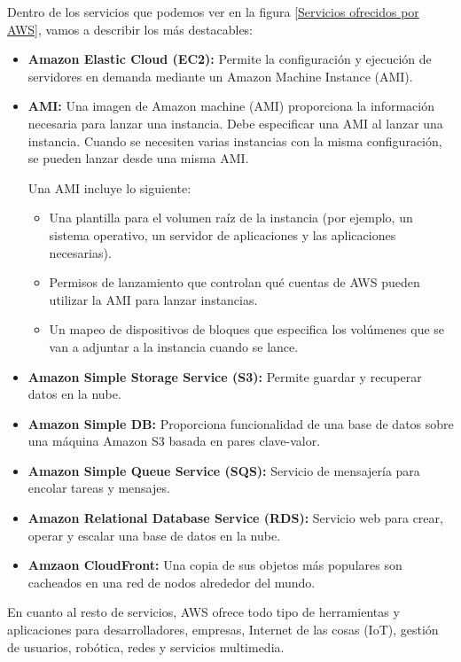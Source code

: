 Dentro de los servicios que podemos ver en la figura \ref{Servicios ofrecidos por AWS}, vamos a describir los más destacables:
\begin{itemize}
	\item \textbf{Amazon Elastic Cloud (EC2):} Permite la configuración y ejecución de servidores en demanda mediante un Amazon Machine Instance (AMI).
	\item \textbf{AMI:} Una imagen de Amazon machine (AMI) proporciona la información necesaria para lanzar una instancia. Debe especificar una AMI al lanzar una instancia. Cuando se necesiten varias instancias con la misma configuración, se pueden lanzar desde una misma AMI.
	
	Una AMI incluye lo siguiente:
	\begin{itemize}
		\item Una plantilla para el volumen raíz de la instancia (por ejemplo, un sistema operativo, un servidor de aplicaciones y las aplicaciones necesarias).
		\item Permisos de lanzamiento que controlan qué cuentas de AWS pueden utilizar la AMI para lanzar instancias.
		\item Un mapeo de dispositivos de bloques que especifica los volúmenes que se van a adjuntar a la instancia cuando se lance.
	\end{itemize}
	\item \textbf{Amazon Simple Storage Service (S3):} Permite guardar y recuperar datos en la nube.
	\item \textbf{Amazon Simple DB:} Proporciona funcionalidad de una base de datos sobre una máquina Amazon S3 basada en pares clave-valor.
	\item \textbf{Amazon Simple Queue Service (SQS):} Servicio de mensajería para encolar tareas y mensajes.
	\item \textbf{Amazon Relational Database Service (RDS):} Servicio web para crear, operar y escalar una base de datos en la nube.
	\item \textbf{Amzaon CloudFront:} Una copia de sus objetos más populares son cacheados en una red de nodos alrededor del mundo.
\end{itemize}

En cuanto al resto de servicios, AWS ofrece todo tipo de herramientas y aplicaciones para desarrolladores, empresas, Internet de las cosas (IoT), gestión de usuarios, robótica, redes y servicios multimedia.

